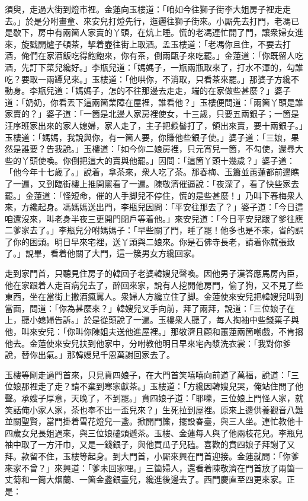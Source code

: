 須臾，走過大街到燈市裡。金蓮向玉樓道：「咱如今往獅子街李大姐房子裡走走去。」於是分咐畫童、來安兒打燈先行，迤邐往獅子街來。小厮先去打門，老馮已是歇下，房中有兩箇人家賣的丫頭，在炕上睡。慌的老馮連忙開了門，讓衆婦女進來，旋戳開爐子頓茶，挈着壺往街上取酒。孟玉樓道：「老馮你且住，不要去打酒，俺們在家酒飯吃得飽飽來，你有茶，倒兩甌子來吃罷。」金蓮道：「你既留人吃酒，先訂下菜兒纔好。」李瓶兒道：「媽媽子，一瓶兩瓶取來了，打水不渾的，勾誰吃？要取一兩罈兒來。」{}玉樓道：「他哄你，不消取，只看茶來罷。」那婆子方纔不動身。李瓶兒道：「媽媽子，怎的不往那邊去走走，端的在家做些甚麼？」婆子道：「奶奶，你看丟下這兩箇業障在屋裡，誰看他？」玉樓便問道：「兩箇丫頭是誰家賣的？」婆子道：「一箇是北邊人家房裡使女，十三歲，只要五兩銀子；一箇是汪序班家出來的家人媳婦，家人走了，主子把鬏髻打了，領出來賣，要十兩銀子。」玉樓道：「媽媽，我說與你，有一箇人要，你賺他些銀子使。」婆子道：「三娘，果然是誰要？告我說。」玉樓道：「如今你二娘房裡，只元宵兒一箇，不勾使，還尋大些的丫頭使喚。你倒把這大的賣與他罷。」因問：「這箇丫頭十幾歲？」婆子道：「他今年十七歲了。」說着，拿茶來，衆人吃了茶。那春梅、玉簫並蕙蓮都前邊瞧了一遍，又到臨街樓上推開窻看了一遍。陳敬濟催逼說：「夜深了，看了快些家去罷。」金蓮道：「怪短命，催的人手脚兒不停住，慌的是些甚麼！」乃叫下春梅衆人來，方纔起身。馮媽媽送出門，李瓶兒因問：「平安往那去了？」婆子道：「今日這咱還沒來，叫老身半夜三更開門閉戶等着他。」來安兒道：「今日平安兒跟了爹往應二爹家去了。」李瓶兒分咐媽媽子：「早些關了門，睡了罷！他多也是不來，省的誤了你的困頭。明日早來宅裡，送丫頭與二娘來。你是石佛寺長老，請着你就張致了。」說畢，看着他關了大門，這一簇男女方纔回家。

走到家門首，只聽見住房子的韓回子老婆韓嫂兒聲喚。{}因他男子漢答應馬房內臣，他在家跟着人走百病兒去了，醉回來家，說有人挖開他房門，偷了狗，又不見了些東西，坐在當街上撒酒瘋罵人。衆婦人方纔立住了脚。金蓮使來安兒把韓嫂兒叫到當面，問道：「你為甚麼來？」韓嫂兒叉手向前，拜了兩拜，說道：「三位娘子在上，聽小媳婦告訴。」於是從頭說了一遍。玉樓衆人聽了，每人掏袖中些錢菓子與他，叫來安兒：「你叫你陳姐夫送他進屋裡。」那敬濟且顧和蕙蓮兩箇嘲戲，不肯搊他去。金蓮使來安兒扶到他家中，分咐教他明日早來宅內漿洗衣裳：「我對你爹說，替你出氣。」那韓嫂兒千恩萬謝回家去了。

玉樓等剛走過門首來，只見賁四娘子，{}在大門首笑嘻嘻向前道了萬福，說道：「三位娘那裡走了走？請不棄到寒家獻茶。」玉樓道：「方纔因韓嫂兒哭，俺站住問了他聲。承嫂子厚意，天晚了，不到罷。」賁四娘子道：「耶嚛，三位娘上門怪人家，就笑話俺小家人家，茶也奉不出一盃兒來？」生死拉到屋裡。原來上邊供養觀音八難並關聖賢，當門掛着雪花燈兒一盞。掀開門簾，擺設春臺，與三人坐。連忙教他十四歲女兒長姐過來，與三位娘磕頭遞茶。玉樓、金蓮每人與了他兩枝花兒。李瓶兒袖中取了一方汗巾，又是一錢銀子，與他買瓜子兒磕。喜歡的賁四娘子拜謝了又拜。款留不住，玉樓等起身。到大門首，小厮來興在門首迎接。金蓮就問：「你爹來家不曾？」來興道：「爹未回家哩。」三箇婦人，還看着陳敬濟在門首放了兩箇一丈菊和一筒大烟蘭、一箇金盞銀臺兒，纔進後邊去了。{}西門慶直至四更來家。正是：

